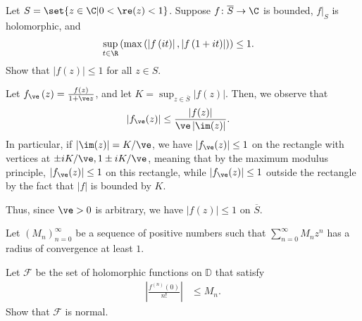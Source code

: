 \documentclass[10pt]{mypackage}
\renewcommand{\D}{\mathbb{D}}
\begin{document}
\begin{problem}[Problem 4]
  Let $S = \set{z\in \C | 0 < \re(z) < 1}$. Suppose $f\colon \overline{S}\rightarrow \C$ is bounded, $f|_{S}$ is holomorphic, and
  \begin{align*}
    \sup_{t\in \R} \left( \max\left( \left\vert f\left( it \right) \right\vert,\left\vert f\left( 1 + it  \right) \right\vert \right) \right) &\leq 1.
  \end{align*}
  Show that $\left\vert f(z) \right\vert\leq 1$ for all $z\in S$.
\end{problem}
\begin{solution}
  Let $f_{\ve}\left( z \right) = \frac{f(z)}{1 + \ve z}$, and let $K = \sup_{z\in \overline{S}} \left\vert f(z) \right\vert$. Then, we observe that
  \begin{align*}
    \left\vert f_{\ve}(z) \right\vert &\leq \frac{\left\vert f(z) \right\vert}{\ve \left\vert \im(z) \right\vert}.
  \end{align*}
  In particular, if $\left\vert \im(z) \right\vert = K/\ve$, we have $ \left\vert f_{\ve}(z) \right\vert\leq 1 $ on the rectangle with vertices at $\pm iK/\ve,1\pm iK/\ve$, meaning that by the maximum modulus principle, $\left\vert f_{\ve}(z) \right\vert \leq 1$ on this rectangle, while $\left\vert f_{\ve}(z) \right\vert \leq 1$ outside the rectangle by the fact that $\left\vert f \right\vert$ is bounded by $K$.%

  Thus, since $\ve > 0$ is arbitrary, we have $\left\vert f(z) \right\vert\leq 1$ on $ \overline{S} $.
\end{solution}
\begin{problem}[Problem 5]
  Let $\left( M_n \right)_{n=0}^{\infty}$ be a sequence of positive numbers such that $\sum_{n=0}^{\infty}M_nz^{n}$ has a radius of convergence at least $1$.%

  Let $\mathcal{F}$ be the set of holomorphic functions on $\D$ that satisfy
  \begin{align*}
    \left\vert \frac{f^{(n)}(0)}{n!} \right\vert &\leq M_n.
  \end{align*}
  Show that $\mathcal{F}$ is normal.
\end{problem}
\end{document}
